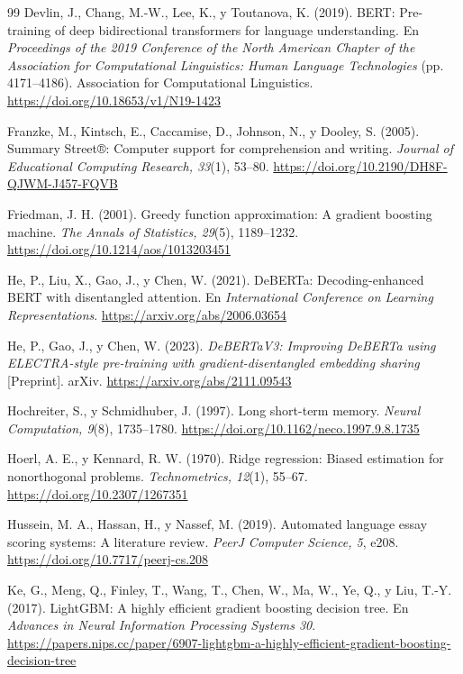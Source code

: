 \documentclass[11pt,a4paper]{article}
\begin{document}
\begin{thebibliography}{99}
Devlin, J., Chang, M.-W., Lee, K., y Toutanova, K. (2019). BERT: Pre-training of deep bidirectional transformers for language understanding. En \textit{Proceedings of the 2019 Conference of the North American Chapter of the Association for Computational Linguistics: Human Language Technologies} (pp. 4171--4186). Association for Computational Linguistics. \url{https://doi.org/10.18653/v1/N19-1423}

Franzke, M., Kintsch, E., Caccamise, D., Johnson, N., y Dooley, S. (2005). Summary Street®: Computer support for comprehension and writing. \textit{Journal of Educational Computing Research, 33}(1), 53--80. \url{https://doi.org/10.2190/DH8F-QJWM-J457-FQVB}

Friedman, J. H. (2001). Greedy function approximation: A gradient boosting machine. \textit{The Annals of Statistics, 29}(5), 1189--1232. \url{https://doi.org/10.1214/aos/1013203451}

He, P., Liu, X., Gao, J., y Chen, W. (2021). DeBERTa: Decoding-enhanced BERT with disentangled attention. En \textit{International Conference on Learning Representations}. \url{https://arxiv.org/abs/2006.03654}

He, P., Gao, J., y Chen, W. (2023). \textit{DeBERTaV3: Improving DeBERTa using ELECTRA-style pre-training with gradient-disentangled embedding sharing} [Preprint]. arXiv. \url{https://arxiv.org/abs/2111.09543}

Hochreiter, S., y Schmidhuber, J. (1997). Long short-term memory. \textit{Neural Computation, 9}(8), 1735--1780. \url{https://doi.org/10.1162/neco.1997.9.8.1735}

Hoerl, A. E., y Kennard, R. W. (1970). Ridge regression: Biased estimation for nonorthogonal problems. \textit{Technometrics, 12}(1), 55--67. \url{https://doi.org/10.2307/1267351}

Hussein, M. A., Hassan, H., y Nassef, M. (2019). Automated language essay scoring systems: A literature review. \textit{PeerJ Computer Science, 5}, e208. \url{https://doi.org/10.7717/peerj-cs.208}

Ke, G., Meng, Q., Finley, T., Wang, T., Chen, W., Ma, W., Ye, Q., y Liu, T.-Y. (2017). LightGBM: A highly efficient gradient boosting decision tree. En \textit{Advances in Neural Information Processing Systems 30}. \url{https://papers.nips.cc/paper/6907-lightgbm-a-highly-efficient-gradient-boosting-decision-tree}


\end{thebibliography}
\end{document}
